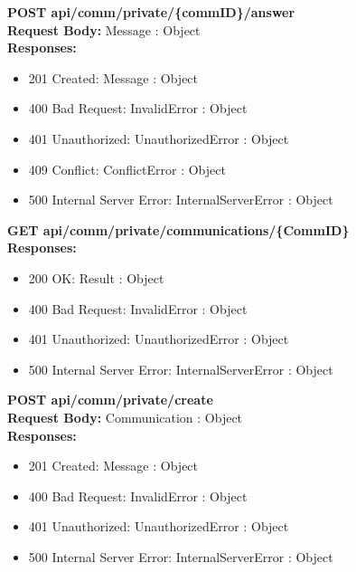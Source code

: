\noindent\textbf{\color{titleColor}POST api/comm/private/\{commID\}/answer}
\vspace{2pt}
\\\textbf{\color{titleColor}Request Body:} Message : Object 
\vspace{4pt}
\\\textbf{\color{titleColor}Responses:} 
\begin{itemize}
    \item {\color{titleColor}201 Created:} Message : Object
    \item {\color{titleColor}400 Bad Request:} InvalidError : Object
    \item {\color{titleColor}401 Unauthorized:} UnauthorizedError : Object
    \item {\color{titleColor}409 Conflict:} ConflictError : Object
    \item {\color{titleColor}500 Internal Server Error:} InternalServerError : Object
\end{itemize}
\vspace{10pt}
\noindent{\color{titleColor}\rule{0.8\linewidth}{0.2mm}}
\vspace{10pt}

\noindent\textbf{\color{titleColor}GET api/comm/private/communications/\{CommID\}}
\vspace{2pt}
\\\textbf{\color{titleColor}Responses:} 
\begin{itemize}
    \item {\color{titleColor}200 OK:} Result : Object
    \item {\color{titleColor}400 Bad Request:} InvalidError : Object
    \item {\color{titleColor}401 Unauthorized:} UnauthorizedError : Object
    \item {\color{titleColor}500 Internal Server Error:} InternalServerError : Object
\end{itemize}
\vspace{10pt}
\noindent{\color{titleColor}\rule{0.8\linewidth}{0.2mm}}
\vspace{10pt}

\noindent\textbf{\color{titleColor}POST api/comm/private/create}
\vspace{2pt}
\\\textbf{\color{titleColor}Request Body:} Communication : Object 
\vspace{4pt}
\\\textbf{\color{titleColor}Responses:} 
\begin{itemize}
    \item {\color{titleColor}201 Created:} Message : Object
    \item {\color{titleColor}400 Bad Request:} InvalidError : Object
    \item {\color{titleColor}401 Unauthorized:} UnauthorizedError : Object
    \item {\color{titleColor}500 Internal Server Error:} InternalServerError : Object
\end{itemize}
\vspace{10pt}
\noindent{\color{titleColor}\rule{0.8\linewidth}{0.2mm}}
\vspace{10pt}

